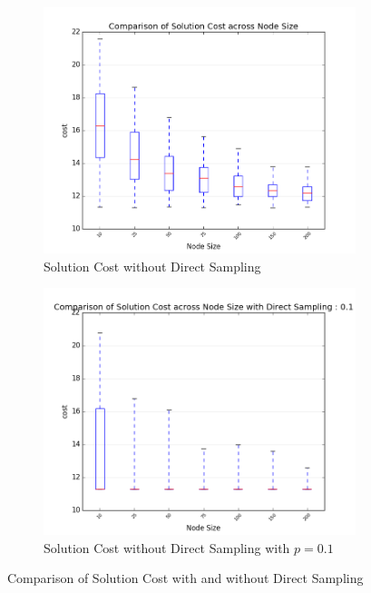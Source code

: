 \documentclass[conference]{IEEEtran}
\begin{document}
\begin{figure}[ht!]
	\centering
	\begin{subfigure}{0.4\textwidth}
		\centering
		\includegraphics[width=1\linewidth]{assets/direct_sample_disabled_boxplot}
		\caption{Solution Cost without Direct Sampling}
		\label{plot_compare_cost:no}
	\end{subfigure}
	\begin{subfigure}{0.4\textwidth}
		\centering
		\includegraphics[width=1\linewidth]{assets/direct_sample_enabled_boxplot}
		\caption{Solution Cost without Direct Sampling with $p=0.1$}
		\label{plot_compare_cost:0.1}
	\end{subfigure}
	\caption{Comparison of Solution Cost with and without Direct Sampling}
	\label{plot_compare_cost}
\end{figure}
\end{document}
